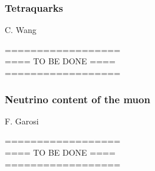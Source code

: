 \documentclass{FBR_Bericht_2025}
\begin{document}
\begin{refsection}
\subsubsection{Tetraquarks}
\begin{Namen}
C. Wang
\end{Namen}
%
{\color{red} ==================\\ ====\; TO BE DONE\; ====\\ ==================}
%
\subsubsection{Neutrino content of the muon}
\begin{Namen}
F. Garosi
\end{Namen}
%
{\color{red} ==================\\ ====\; TO BE DONE\; ====\\ ==================}
%
\printbibliography[heading=subbibliography]
\end{refsection}

\end{document}
